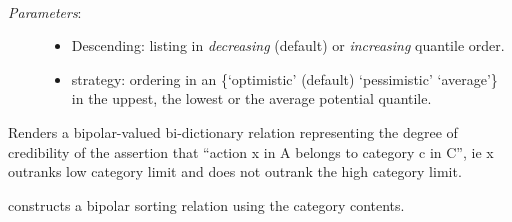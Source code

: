 \documentclass[letterpaper,10pt,english]{sphinxmanual}
\begin{document}
\begin{fulllineitems}
\begin{fulllineitems}
\end{fulllineitems}


\begin{fulllineitems}
\label{techDoc:sortingDigraphs.QuantilesSortingDigraph.computeQuantileOrdering}~\begin{description}
\item[{\emph{Parameters}:}] \leavevmode\begin{itemize}
\item {} 
Descending: listing in \emph{decreasing} (default) or \emph{increasing} quantile order.

\item {} 
strategy: ordering in an \{`optimistic' (default) \textbar{} `pessimistic' \textbar{} `average'\}
in the uppest, the lowest or the average potential quantile.

\end{itemize}

\end{description}

\end{fulllineitems}


\begin{fulllineitems}
\label{techDoc:sortingDigraphs.QuantilesSortingDigraph.computeSortingCharacteristics}
Renders a bipolar-valued bi-dictionary relation
representing the degree of credibility of the
assertion that ``action x in A belongs to category c in C'',
ie x outranks low category limit and does not outrank
the high category limit.

\end{fulllineitems}


\begin{fulllineitems}
\label{techDoc:sortingDigraphs.QuantilesSortingDigraph.computeSortingRelation}
constructs a bipolar sorting relation using the category contents.


\end{fulllineitems}
\end{fulllineitems}
\end{document}
